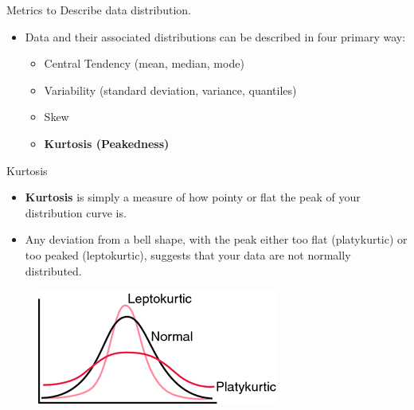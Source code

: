 \documentclass[
  ignorenonframetext,
]{beamer}
\providecommand{\tightlist}{%
  \setlength{\itemsep}{0pt}\setlength{\parskip}{0pt}}
\begin{document}
\begin{frame}{Metrics to Describe data distribution.}
\label{metrics-to-describe-data-distribution.-4}
\begin{itemize}
\item
  Data and their associated distributions can be described in four
  primary way:

  \begin{itemize}
  \tightlist
  \item
    Central Tendency (mean, median, mode)
  \item
    Variability (standard deviation, variance, quantiles)
  \item
    Skew
  \item
    \textbf{Kurtosis (Peakedness)}
  \end{itemize}
\end{itemize}
\end{frame}

\begin{frame}{Kurtosis}
\label{kurtosis}
\begin{itemize}
\tightlist
\item
  \textbf{Kurtosis} is simply a measure of how pointy or flat the peak
  of your distribution curve is.
\end{itemize}

\begin{itemize}
\tightlist
\item
  Any deviation from a bell shape, with the peak either too flat
  (platykurtic) or too peaked (leptokurtic), suggests that your data are
  not normally distributed.
\end{itemize}

\begin{figure}
\includegraphics[width=0.6\linewidth]{fig/kurtosis} \end{figure}
\end{frame}
\end{document}
